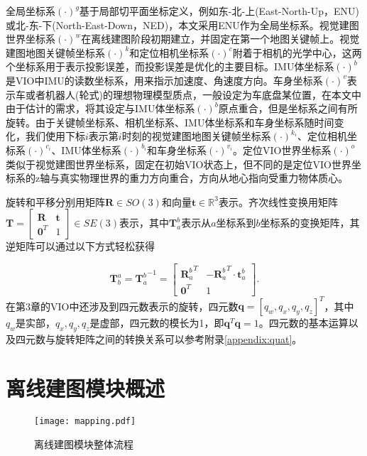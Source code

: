 全局坐标系$(\cdot)^{g}$基于局部切平面坐标定义，例如东-北-上(East-North-Up，ENU)或北-东-下(North-East-Down，NED)，本文采用ENU作为全局坐标系。视觉建图世界坐标系$(\cdot)^{w}$在离线建图阶段初期建立，并固定在第一个地图关键帧上。视觉建图地图关键帧坐标系$(\cdot)^{k}$和定位相机坐标系$(\cdot)^{c}$附着于相机的光学中心，这两个坐标系用于表示投影误差，而投影误差是优化的主要目标。IMU体坐标系$(\cdot)^{b}$是VIO中IMU的读数坐标系，用来指示加速度、角速度方向。车身坐标系$(\cdot)^{v}$表示车或者机器人(轮式)的理想物理模型质点，一般设定为车底盘某位置，在本文中由于估计的需求，将其设定与IMU体坐标系$(\cdot)^{b}$原点重合，但是坐标系之间有所旋转。由于关键帧坐标系、相机坐标系、IMU体坐标系和车身坐标系随时间变化，我们使用下标$i$表示第$i$时刻的视觉建图地图关键帧坐标系$(\cdot)^{k_i}$、定位相机坐标系$(\cdot)^{c_i}$、IMU体坐标系$(\cdot)^{b_i}$和车身坐标系$(\cdot)^{v_i}$。定位VIO世界坐标系$(\cdot)^{o}$类似于视觉建图世界坐标系，固定在初始VIO状态上，但不同的是定位VIO世界坐标系的z轴与真实物理世界的重力方向重合，方向从地心指向受重力物体质心。

旋转和平移分别用矩阵$\symbf{R} \in SO(3)$和向量$\symbf{t} \in \mathbb{R}^{3}$表示。齐次线性变换用矩阵$\symbf{T} = \begin{bmatrix} \symbf{R} & \symbf{t} \\ \symbf{0}^T & 1 \end{bmatrix} \in SE(3)$表示，其中$\symbf{T}_{a}^{b}$表示从$a$坐标系到$b$坐标系的变换矩阵，其逆矩阵可以通过以下方式轻松获得

\begin{equation}
  \symbf{T}^a_b = {\symbf{T}_a^b}^{-1} = \begin{bmatrix} {\symbf{R}_a^b}^T & -{\symbf{R}_a^b}^T\cdot\symbf{t}_a^b \\ \symbf{0}^T & 1 \end{bmatrix}.
\end{equation}
在第3章的VIO中还涉及到四元数表示的旋转，四元数$\symbf{q} = [q_w, q_x, q_y, q_z]^T$，其中$q_w$是实部，$q_x, q_y, q_z$是虚部，四元数的模长为1，即$\symbf{q}^T\symbf{q} = 1$。四元数的基本运算以及四元数与旋转矩阵之间的转换关系可以参考附录\ref{appendix:quat}。

\section{离线建图模块概述}

\begin{figure}
  \centering
  \texttt{[image: mapping.pdf]}
  \caption{离线建图模块整体流程}
  \label{fig:mapping}
\end{figure}

